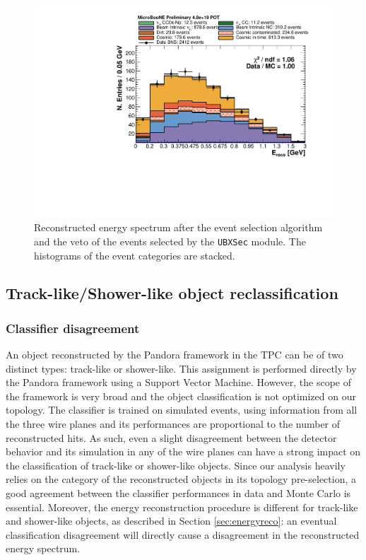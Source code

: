 \begin{figure}[htbp]
\centering
  \includegraphics[width=0.65\linewidth]{figures/h_fixed_energy.pdf}
  \caption{Reconstructed energy spectrum after the event selection algorithm and the veto of the events selected by the \texttt{UBXSec} module. The histograms of the event categories are stacked.}
  \label{fig:spectrum}
\end{figure}



\subsection{Track-like/Shower-like object reclassification}\label{sec:reclass}
\subsubsection{Classifier disagreement}
An object reconstructed by the Pandora framework in the TPC can be of two distinct types: track-like or shower-like. This assignment is performed directly by the Pandora framework using a Support Vector Machine. However, the scope of the framework is very broad and the object classification is not optimized on our topology. 
The classifier is trained on simulated events, using information from all the three wire planes and its performances are proportional to the number of reconstructed hits. As such, even a slight disagreement between the detector behavior and its simulation in any of the wire planes can have a strong impact on the classification of track-like or shower-like objects. 
Since our analysis heavily relies on the category of the reconstructed objects in its topology pre-selection, a good agreement between the classifier performances in data and Monte Carlo is essential.
Moreover, the energy reconstruction procedure is different for track-like and shower-like objects, as described in Section \ref{sec:energyreco}: an eventual classification disagreement will directly cause a disagreement in the reconstructed energy spectrum.



